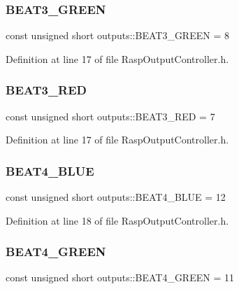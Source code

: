 \subsubsection{\texorpdfstring{B\+E\+A\+T3\+\_\+\+G\+R\+E\+EN}{BEAT3\_GREEN}}
{\footnotesize\ttfamily const unsigned short outputs\+::\+B\+E\+A\+T3\+\_\+\+G\+R\+E\+EN = 8}



Definition at line 17 of file Rasp\+Output\+Controller.\+h.

\mbox{\label{namespaceoutputs_a0c48c063f394a0735f24036e932bff2b}} 
\subsubsection{\texorpdfstring{B\+E\+A\+T3\+\_\+\+R\+ED}{BEAT3\_RED}}
{\footnotesize\ttfamily const unsigned short outputs\+::\+B\+E\+A\+T3\+\_\+\+R\+ED = 7}



Definition at line 17 of file Rasp\+Output\+Controller.\+h.

\mbox{\label{namespaceoutputs_aa66f074e1960dc7dbf507acdf6cc5ae3}} 
\subsubsection{\texorpdfstring{B\+E\+A\+T4\+\_\+\+B\+L\+UE}{BEAT4\_BLUE}}
{\footnotesize\ttfamily const unsigned short outputs\+::\+B\+E\+A\+T4\+\_\+\+B\+L\+UE = 12}



Definition at line 18 of file Rasp\+Output\+Controller.\+h.

\mbox{\label{namespaceoutputs_afd9270436632213bade739dbc4f6c8f6}} 
\subsubsection{\texorpdfstring{B\+E\+A\+T4\+\_\+\+G\+R\+E\+EN}{BEAT4\_GREEN}}
{\footnotesize\ttfamily const unsigned short outputs\+::\+B\+E\+A\+T4\+\_\+\+G\+R\+E\+EN = 11}



